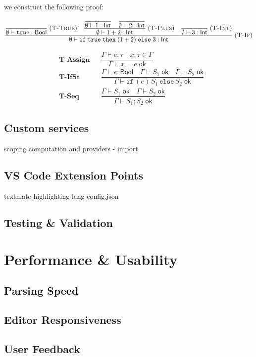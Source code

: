 we construct the following proof:

$$
  \dfrac{
    \dfrac{}{\emptyset \vdash \mathtt{true} : \mathsf{Bool}} \; (\textsc{T-True})
    \quad
    \dfrac{
      \dfrac{}{\emptyset \vdash 1 : \mathsf{Int}} \quad
      \dfrac{}{\emptyset \vdash 2 : \mathsf{Int}}
    }{\emptyset \vdash 1+2 : \mathsf{Int}} \; (\textsc{T-Plus})
    \quad
    \dfrac{}{\emptyset \vdash 3 : \mathsf{Int}} \; (\textsc{T-Int})
  }{
    \emptyset \vdash \mathtt{if}\;\mathtt{true}\;\mathtt{then}\;(1+2)\;\mathtt{else}\;3 : \mathsf{Int}
  } \; (\textsc{T-If})
$$

\begin{align*}
   & \textbf{T-Assign}
   &                   & \dfrac{Γ ⊢ e : τ \quad x:τ ∈ Γ}
  {Γ ⊢ x = e\;\mathsf{ok}}                                     \\[1ex]
   & \textbf{T-IfSt}
   &                   & \dfrac{Γ ⊢ e : \mathsf{Bool}
    \quad Γ ⊢ S_1\;\mathsf{ok}
    \quad Γ ⊢ S_2\;\mathsf{ok}}
  {Γ ⊢ \mathtt{if}\,(e)\,S_1\,\mathtt{else}\,S_2\;\mathsf{ok}} \\[1ex]
   & \textbf{T-Seq}
   &                   & \dfrac{Γ ⊢ S_1\;\mathsf{ok}
    \quad Γ ⊢ S_2\;\mathsf{ok}}
  {Γ ⊢ S_1; S_2\;\mathsf{ok}}
\end{align*}



\section*{Custom services}
\label{sec:customservices}
scoping computation and providers - import
\section{VS Code Extension Points}
textmate highlighting lang-config.json
\section{Testing \& Validation}

\chapter{Performance \& Usability}
\section{Parsing Speed}
\section{Editor Responsiveness}
\section{User Feedback}
